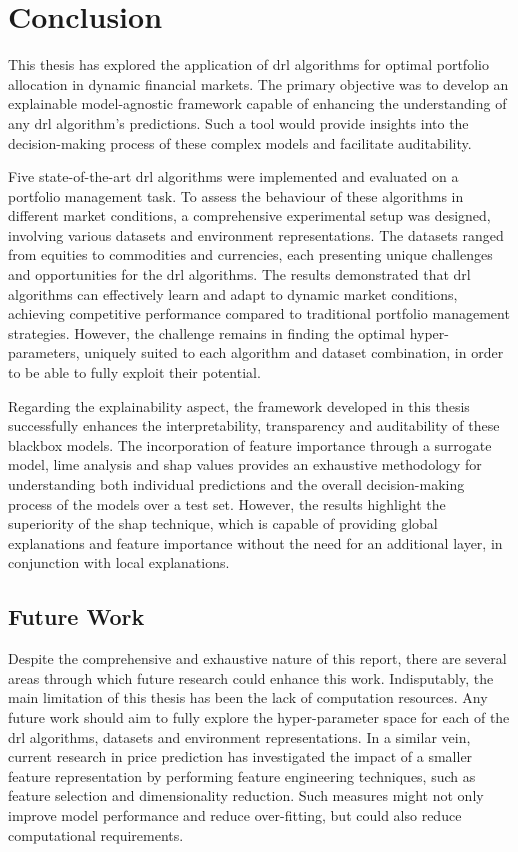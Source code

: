 \chapter{Conclusion} \label{ch:conclusion}

This thesis has explored the application of \acrfull{drl} algorithms for optimal portfolio allocation in dynamic financial markets. The primary objective was to develop an explainable model-agnostic framework capable of enhancing the understanding of any \acrshort{drl} algorithm's predictions. Such a tool would provide insights into the decision-making process of these complex models and facilitate auditability.

Five state-of-the-art \acrshort{drl} algorithms were implemented and evaluated on a portfolio management task. To assess the behaviour of these algorithms in different market conditions, a comprehensive experimental setup was designed, involving various datasets and environment representations. The datasets ranged from equities to commodities and currencies, each presenting unique challenges and opportunities for the \acrshort{drl} algorithms. The results demonstrated that \acrshort{drl} algorithms can effectively learn and adapt to dynamic market conditions, achieving competitive performance compared to traditional portfolio management strategies. However, the challenge remains in finding the optimal hyper-parameters, uniquely suited to each algorithm and dataset combination, in order to be able to fully exploit their potential.

Regarding the explainability aspect, the framework developed in this thesis successfully enhances the interpretability, transparency and auditability of these \gls{blackbox} models. The incorporation of feature importance through a surrogate model, \acrfull{lime} analysis and \acrfull{shap} values provides an exhaustive methodology for understanding both individual predictions and the overall decision-making process of the models over a test set. However, the results highlight the superiority of the \acrshort{shap} technique, which is capable of providing global explanations and feature importance without the need for an additional layer, in conjunction with local explanations. 

\section{Future Work} \label{sec:future-work}

Despite the comprehensive and exhaustive nature of this report, there are several areas through which future research could enhance this work. Indisputably, the main limitation of this thesis has been the lack of computation resources. Any future work should aim to fully explore the hyper-parameter space for each of the \acrshort{drl} algorithms, datasets and environment representations. In a similar vein, current research in price prediction has investigated the impact of a smaller feature representation by performing feature engineering techniques, such as feature selection and dimensionality reduction. Such measures might not only improve model performance and reduce over-fitting, but could also reduce computational requirements.

